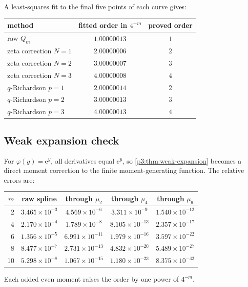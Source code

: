 \documentclass[11pt,oneside]{article}
\numberwithin{equation}{section}
\theoremstyle{definition}
\theoremstyle{remark}
\newcommand{\e}{\mathrm e}
\begin{document}
A least-squares fit to the final five points of each curve gives:
\begin{center}
\small
\begin{tabular}{@{}lcc@{}}
\toprule
method & fitted order in $4^{-m}$ & proved order \\
\midrule
raw $Q_m$ & $1.00000013$ & $1$\\
zeta correction $N=1$ & $2.00000006$ & $2$\\
zeta correction $N=2$ & $3.00000007$ & $3$\\
zeta correction $N=3$ & $4.00000008$ & $4$\\
$q$-Richardson $p=1$ & $2.00000014$ & $2$\\
$q$-Richardson $p=2$ & $3.00000013$ & $3$\\
$q$-Richardson $p=3$ & $4.00000013$ & $4$\\
\bottomrule
\end{tabular}
\end{center}

\subsection{Weak expansion check}

For $\varphi(y)=\e^y$, all derivatives equal $\e^y$, so
\cref{p3:thm:weak-expansion} becomes a direct moment correction to the finite moment-generating
function.  The relative errors are:
\begin{center}
\small
\begin{tabular}{@{}rcccc@{}}
\toprule
$m$ & raw spline & through $\mu_2$ & through $\mu_4$ & through $\mu_6$\\
\midrule
2 & $3.465\times10^{-3}$ & $4.569\times10^{-6}$ & $3.311\times10^{-9}$ & $1.540\times10^{-12}$\\
4 & $2.170\times10^{-4}$ & $1.789\times10^{-8}$ & $8.105\times10^{-13}$ & $2.357\times10^{-17}$\\
6 & $1.356\times10^{-5}$ & $6.991\times10^{-11}$ & $1.979\times10^{-16}$ & $3.597\times10^{-22}$\\
8 & $8.477\times10^{-7}$ & $2.731\times10^{-13}$ & $4.832\times10^{-20}$ & $5.489\times10^{-27}$\\
10 & $5.298\times10^{-8}$ & $1.067\times10^{-15}$ & $1.180\times10^{-23}$ & $8.375\times10^{-32}$\\
\bottomrule
\end{tabular}
\end{center}
Each added even moment raises the order by one power of $4^{-m}$.
\end{document}
